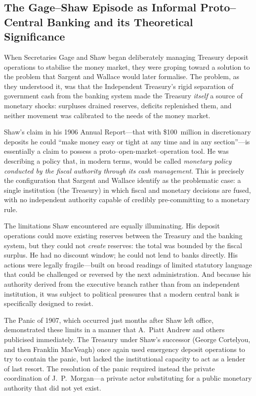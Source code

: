 \documentclass[12pt]{article}
\begin{document}
\subsection{The Gage--Shaw Episode as Informal Proto--Central Banking
and its Theoretical Significance}

When Secretaries Gage and Shaw began deliberately managing Treasury
deposit operations to stabilise the money market, they were groping
toward a solution to the problem that Sargent and Wallace would later
formalise.  The problem, as they understood it, was that the
Independent Treasury's rigid separation of government cash from the
banking system made the Treasury \emph{itself} a source of monetary
shocks: surpluses drained reserves, deficits replenished them, and
neither movement was calibrated to the needs of the money market.

Shaw's claim in his 1906 Annual Report---that with \$100~million in
discretionary deposits he could ``make money easy or tight at any
time and in any section''---is essentially a claim to possess a
proto--open-market--operation tool.  He was describing a policy that,
in modern terms, would be called \emph{monetary policy conducted by
the fiscal authority through its cash management}.  This is
precisely the configuration that Sargent and Wallace identify as the
problematic case: a single institution (the Treasury) in which fiscal
and monetary decisions are fused, with no independent authority
capable of credibly pre-committing to a monetary rule.

The limitations Shaw encountered are equally illuminating.  His
deposit operations could move existing reserves between the Treasury
and the banking system, but they could not \emph{create} reserves:
the total was bounded by the fiscal surplus.  He had no discount
window; he could not lend to banks directly.  His actions were legally
fragile---built on broad readings of limited statutory language that
could be challenged or reversed by the next administration.  And
because his authority derived from the executive branch rather than
from an independent institution, it was subject to political pressures
that a modern central bank is specifically designed to resist.

The Panic of 1907, which occurred just months after Shaw left office,
demonstrated these limits in a manner that A.~Piatt Andrew and others
publicised immediately.  The Treasury under Shaw's successor (George
Cortelyou, and then Franklin MacVeagh) once again used emergency
deposit operations to try to contain the panic, but lacked the
institutional capacity to act as a lender of last resort.  The
resolution of the panic required instead the private coordination of
J.~P.~Morgan---a private actor substituting for a public monetary
authority that did not yet exist.
\end{document}
